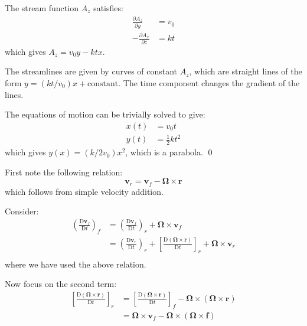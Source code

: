 \documentclass[12pt]{article}
\begin{document}

The stream function $A_{z}$ satisfies:
\begin{equation}
    \begin{split}
        \frac{\partial A_{z}}{\partial y} &= v_{0} \\
        -\frac{\partial A_{x}}{\partial z} &= kt
    \end{split}
\end{equation}
which gives $A_{z} = v_{0}y - ktx$.

The streamlines are given by curves of constant $A_{z}$, which are straight lines of the form $y = (kt/v_{0}) x + \text{constant}$. The time component changes the gradient of the lines.

The equations of motion can be trivially solved to give:
\begin{equation}
    \begin{split}
        x(t) &= v_{0} t \\
        y(t) &= \frac{1}{2} kt^{2}
    \end{split}
\end{equation}
which gives $y(x) = (k/2v_{0}) x^{2}$, which is a parabola.
\qed


First note the following relation:
\begin{equation}
    \mathbf{v}_{r} = \mathbf{v}_{f} - \mathbf{\Omega} \times \mathbf{r}
\end{equation}
which follows from simple velocity addition.

Consider:
\begin{equation}
    \begin{split}
        \left( \frac{\mathrm{D} \mathbf{v}_{f}}{\mathrm{D} t} \right)_{f} &= \left( \frac{\mathrm{D} \mathbf{v}_{f}}{\mathrm{D} t} \right)_{r} + \mathbf{\Omega} \times \mathbf{v}_{f} \\
        &= \left( \frac{\mathrm{D} \mathbf{v}_{r}}{\mathrm{D} t} \right)_{r} + \left[ \frac{\mathrm{D} (\mathbf{\Omega} \times \mathbf{r})}{\mathrm{D} t} \right]_{r} + \mathbf{\Omega} \times \mathbf{v}_{r} \\
    \end{split}
\end{equation}
where we have used the above relation.

Now focus on the second term:
\begin{equation}
    \begin{split}
        \left[ \frac{\mathrm{D} (\mathbf{\Omega} \times \mathbf{r})}{\mathrm{D} t} \right]_{r} &= \left[ \frac{\mathrm{D} (\mathbf{\Omega} \times \mathbf{r})}{\mathrm{D} t} \right]_{f} - \mathbf{\Omega} \times (\mathbf{\Omega} \times \mathbf{r}) \\
        &= \mathbf{\Omega} \times \mathbf{v}_{f} - \mathbf{\Omega} \times (\mathbf{\Omega} \times \mathbf{f})
    \end{split}
\end{equation}
\end{document}
